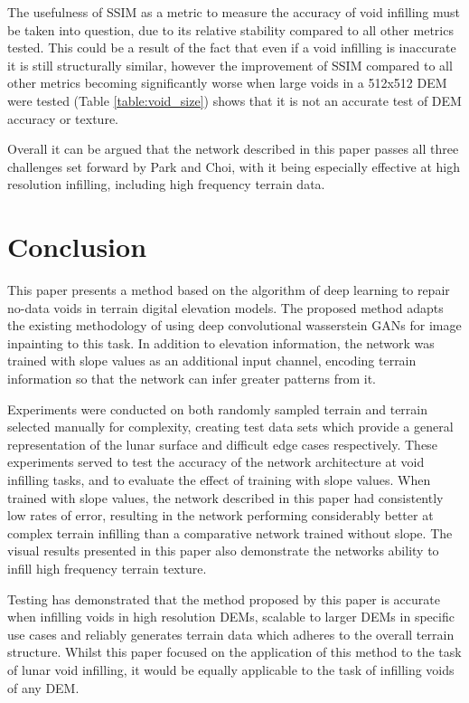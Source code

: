 \documentclass[twocolumn]{article}
\begin{document}
The usefulness of SSIM as a metric to measure the accuracy of void infilling must be taken into question, due to its relative stability compared to all other metrics tested.
This could be a result of the fact that even if a void infilling is inaccurate it is still structurally similar, however the improvement of SSIM compared to all other metrics becoming significantly worse when large voids in a 512x512 DEM were tested (Table \ref{table:void_size}) shows that it is not an accurate test of DEM accuracy or texture.

Overall it can be argued that the network described in this paper passes all three challenges set forward by Park and Choi, with it being especially effective at high resolution infilling, including high frequency terrain data.

\section{Conclusion}
\label{sec:org7dfe21c}

This paper presents a method based on the algorithm of deep learning to repair no-data voids in terrain digital elevation models.
The proposed method adapts the existing methodology of using deep convolutional wasserstein GANs for image inpainting to this task.
In addition to elevation information, the network was trained with slope values as an additional input channel, encoding terrain information so that the network can infer greater patterns from it.

Experiments were conducted on both randomly sampled terrain and terrain selected manually for complexity, creating test data sets which provide a general representation of the lunar surface and difficult edge cases respectively.
These experiments served to test the accuracy of the network architecture at void infilling tasks, and to evaluate the effect of training with slope values.
When trained with slope values, the network described in this paper had consistently low rates of error, resulting in the network performing considerably better at complex terrain infilling than a comparative network trained without slope.
The visual results presented in this paper also demonstrate the networks ability to infill high frequency terrain texture.

Testing has demonstrated that the method proposed by this paper is accurate when infilling voids in high resolution DEMs, scalable to larger DEMs in specific use cases and reliably generates terrain data which adheres to the overall terrain structure. Whilst this paper focused on the application of this method to the task of lunar void infilling, it would be equally applicable to the task of infilling voids of any DEM.
\end{document}
